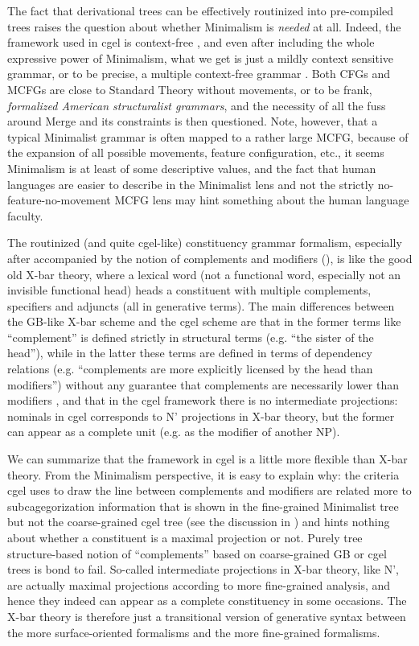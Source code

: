 \documentclass[../main.tex]{subfiles}
\begin{document}
The fact that derivational trees can be effectively routinized into pre-compiled trees 
raises the question about whether Minimalism is \emph{needed} at all.
Indeed, the framework used in \ac{cgel} is context-free \citep{pullum2008expressive}, 
and even after including the whole expressive power of Minimalism, 
what we get is just a mildly context sensitive grammar, or to be precise, 
a multiple context-free grammar \citep{clark2014introduction}.
Both CFGs and MCFGs are close to Standard Theory without movements, 
or to be frank, \emph{formalized American structuralist grammars},
and the necessity of all the fuss around Merge and its constraints is then questioned.
Note, however, that a typical Minimalist grammar is often mapped to a rather large 
MCFG, because of the expansion of all possible movements, feature configuration, etc., 
it seems Minimalism is at least of some descriptive values,
and the fact that human languages are easier to describe in the Minimalist lens 
and not the strictly no-feature-no-movement MCFG lens may hint something about the human language faculty.

The routinized (and quite \ac{cgel}-like) constituency grammar formalism, 
especially after accompanied by the notion of complements and modifiers (), 
is like the good old X-bar theory, where a lexical word 
(not a functional word, especially not an invisible functional head) heads a constituent 
with multiple complements, specifiers and adjuncts (all in generative terms). 
The main differences between the GB-like X-bar scheme and the \ac{cgel} scheme are 
that in the former terms like ``complement'' is defined strictly in structural terms 
(e.g. ``the sister of the head''), 
while in the latter these terms are defined in terms of dependency relations 
(e.g. ``complements are more explicitly licensed by the head than modifiers'') 
without any guarantee that complements are necessarily lower than modifiers \citep{payne2007fusion},
and that in the \ac{cgel} framework there is no intermediate projections: 
nominals in \ac{cgel} corresponds to N' projections in X-bar theory, 
but the former can appear as a complete unit (e.g. as the modifier of another NP). 

We can summarize that the framework in \ac{cgel} is a little more flexible than X-bar theory. 
From the Minimalism perspective, it is easy to explain why: 
the criteria \ac{cgel} uses to draw the line between complements and modifiers are related 
more to subcagegorization information that is shown in the fine-grained Minimalist tree 
but not the coarse-grained \ac{cgel} tree (see the discussion in ) 
and hints nothing about whether a constituent is a maximal projection or not. 
Purely tree structure-based notion of ``complements'' based on coarse-grained GB or \ac{cgel} trees is bond to fail. 
So-called intermediate projections in X-bar theory, like N', 
are actually maximal projections according to more fine-grained analysis, 
and hence they indeed can appear as a complete constituency in some occasions.
The X-bar theory is therefore just a transitional version of generative syntax between the more surface-oriented
formalisms and the more fine-grained formalisms.
\end{document}

